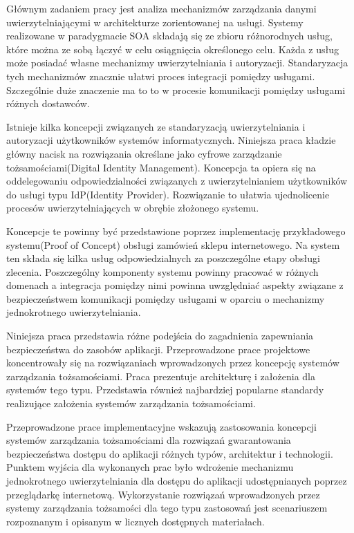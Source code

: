 	Głównym zadaniem pracy jest analiza mechanizmów zarządzania danymi uwierzytelniającymi w architekturze zorientowanej na usługi. Systemy realizowane w paradygmacie SOA składają się ze zbioru różnorodnych usług, które można ze sobą łączyć w celu osiągnięcia określonego celu. Każda z usług może posiadać własne mechanizmy uwierzytelniania i autoryzacji. Standaryzacja tych mechanizmów znacznie ułatwi proces integracji pomiędzy usługami. Szczególnie duże znaczenie ma to to w procesie komunikacji pomiędzy usługami różnych dostawców. 

	Istnieje kilka koncepcji związanych ze standaryzacją uwierzytelniania i autoryzacji użytkowników systemów informatycznych. Niniejsza praca kładzie główny nacisk na rozwiązania określane jako cyfrowe zarządzanie tożsamościami(Digital Identity Management). Koncepcja ta opiera się na oddelegowaniu odpowiedzialności związanych z uwierzytelnianiem użytkowników do usługi typu IdP(Identity Provider). Rozwiązanie to ułatwia ujednolicenie procesów uwierzytelniających w obrębie złożonego systemu.

	Koncepcje te powinny być przedstawione poprzez implementację przykładowego systemu(Proof of Concept) obsługi zamówień sklepu internetowego. Na system ten składa się kilka usług odpowiedzialnych za poszczególne etapy obsługi zlecenia. Poszczególny komponenty systemu powinny pracować w różnych domenach a integracja pomiędzy nimi powinna uwzględniać aspekty związane z bezpieczeństwem komunikacji pomiędzy usługami w oparciu o mechanizmy jednokrotnego uwierzytelniania.


\label{sec:osiagnieciaPracy}

	Niniejsza praca przedstawia różne podejścia do zagadnienia zapewniania bezpieczeństwa do zasobów aplikacji. Przeprowadzone prace projektowe koncentrowały się na rozwiązaniach wprowadzonych przez koncepcję systemów zarządzania tożsamościami. Praca prezentuje architekturę i założenia dla systemów tego typu. Przedstawia również najbardziej popularne standardy realizujące założenia systemów zarządzania tożsamościami.

	Przeprowadzone prace implementacyjne wskazują zastosowania koncepcji systemów zarządzania tożsamościami dla rozwiązań gwarantowania bezpieczeństwa dostępu do aplikacji różnych typów, architektur i technologii. Punktem wyjścia dla wykonanych prac było wdrożenie mechanizmu jednokrotnego uwierzytelniania dla dostępu do aplikacji udostępnianych poprzez przeglądarkę internetową. Wykorzystanie rozwiązań wprowadzonych przez systemy zarządzania tożsamości dla tego typu zastosowań jest scenariuszem rozpoznanym i opisanym w licznych dostępnych materiałach.

